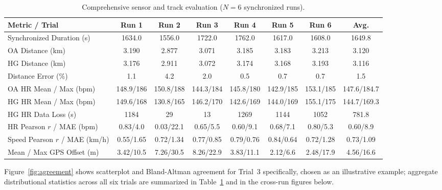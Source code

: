 \documentclass{acmsiggraph}
\begin{document}
	\begin{table}[t]
		\centering
		\caption{Comprehensive sensor and track evaluation ($N=6$ synchronized runs).}
		\label{tab:results}
		\small
		\begin{tabular}{lccccccc}
			\toprule
			Metric / Trial & Run 1 & Run 2 & Run 3 & Run 4 & Run 5 & Run 6 & Avg. \\
			\midrule
			Synchronized Duration (s) & 1634.0 & 1556.0 & 1722.0 & 1762.0 & 1617.0 & 1608.0 & 1649.8 \\
			OA Distance (km)          & 3.190  & 2.877  & 3.071  & 3.185  & 3.183  & 3.213  & 3.120 \\
			HG Distance (km)          & 3.176  & 2.911  & 3.072  & 3.174  & 3.168  & 3.193  & 3.116 \\
			Distance Error (\%)       & 1.1    & 4.2    & 2.0    & 0.5    & 0.7    & 0.7    & 1.5 \\
			\midrule
			OA HR Mean / Max (bpm)    & 148.9/186 & 150.8/188 & 144.3/184 & 145.8/180 & 142.9/185 & 153.1/185 & 147.6/184.7 \\
			HG HR Mean / Max (bpm)    & 149.6/168 & 130.8/165 & 146.2/170 & 142.6/169 & 144.0/169 & 155.1/175 & 144.7/169.3 \\
			HG HR Data Loss (s)       & 1184   & 29     & 13     & 1269   & 1144   & 1052   & 781.8 \\
			HR Pearson $r$ / MAE (bpm) & 0.83/4.0 & 0.03/22.1 & 0.65/5.5 & 0.60/9.1 & 0.68/7.1 & 0.80/5.3 & 0.60/8.9 \\
			Speed Pearson $r$ / MAE (km/h) & 0.55/1.65 & 0.72/1.34 & 0.77/0.85 & 0.79/0.76 & 0.84/0.64 & 0.72/1.28 & 0.73/1.09 \\
			\midrule
			Mean / Max GPS Offset (m) & 3.42/10.5 & 7.26/30.5 & 8.26/22.9 & 3.83/11.1 & 2.12/6.6 & 2.48/17.9 & 4.56/16.6 \\
			\bottomrule
		\end{tabular}
	\end{table}
	
	Figure~\ref{fig:agreement} shows scatterplot and Bland-Altman agreement
	for Trial~3 specifically, chosen as an illustrative example; aggregate
	distributional statistics across all six trials are summarized in
	Table~\ref{tab:results} and in the cross-run figures below.
	
\end{document}
